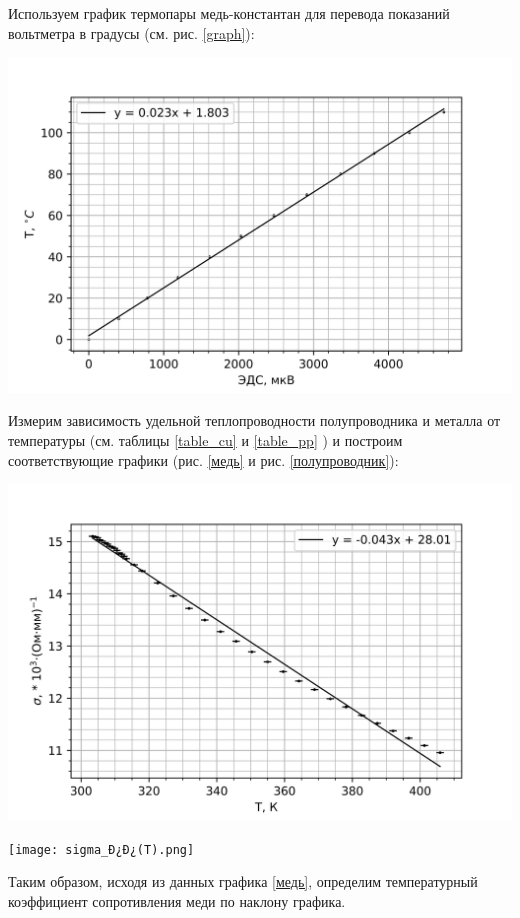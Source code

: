 \documentclass[a4paper,12pt]{report}
\begin{document}
Используем график термопары медь-константан для перевода показаний вольтметра в градусы (см. рис. \ref{graph}):

\begin{center}
    \includegraphics[width = 0.7 \linewidth]{graph.png}
    \label{graph}
\end{center}

Измерим зависимость удельной теплопроводности полупроводника и металла от температуры (см. таблицы \ref{table_cu} и \ref{table_pp} ) и построим соответствующие графики (рис. \ref{медь} и рис. \ref{полупроводник}):

\begin{center}
    \includegraphics[width = 0.7 \linewidth]{sigma_Cu(T).png}
    \label{медь}
\end{center}

\begin{center}
    \texttt{[image: sigma\_Ð¿Ð¿(T).png]}
    \label{полупроводник}
\end{center}

Таким образом, исходя из данных графика \ref{медь}, определим температурный коэффициент сопротивления меди по наклону графика.
\end{document}
